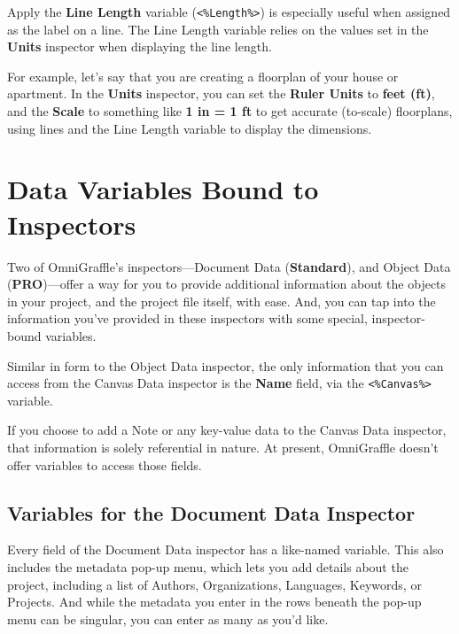 \documentclass[../main.tex]{subfiles}
\begin{document}
Apply the \textbf{Line Length} variable (\texttt{<\%Length\%>}) is especially useful when
assigned as the label on a line. The Line Length variable relies on the values set in the
\textbf{Units} inspector when displaying the line length.

For example, let's say that you are creating a floorplan of your house or apartment. In the
\textbf{Units} inspector, you can set the \textbf{Ruler Units} to \textbf{feet (ft)}, and the
\textbf{Scale} to something like \textbf{1 in = 1 ft} to get accurate (to-scale) floorplans,
using lines and the Line Length variable to display the dimensions.


\section{Data Variables Bound to Inspectors}

Two of OmniGraffle's inspectors---Document Data (\textbf{Standard}), and Object Data
(\textbf{PRO})---offer a way for you to provide additional information about the objects in
your project, and the project file itself, with ease. And, you can tap into the information
you've provided in these inspectors with some special, inspector-bound variables.


\begin{ognote}
  Similar in form to the Object Data inspector, the only information that you can access from the
  Canvas Data inspector is the \textbf{Name} field, via the \texttt{<\%Canvas\%>} variable.

  If you choose to add a Note or any key-value data to the Canvas Data inspector, that
  information is solely referential in nature. At present, OmniGraffle doesn't offer variables
  to access those fields.
\end{ognote}

\subsection{Variables for the Document Data Inspector}

Every field of the Document Data inspector has a like-named variable. This also includes the
metadata pop-up menu, which lets you add details about the project, including a list of
Authors, Organizations, Languages, Keywords, or Projects. And while the metadata you enter in
the rows beneath the pop-up menu can be singular, you can enter as many as you'd like.
\end{document}

